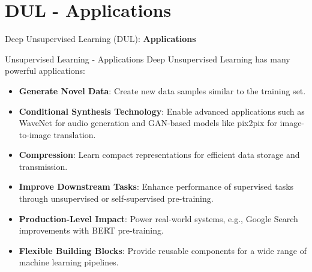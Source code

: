 \section{DUL - Applications}
\begin{frame}{}
    \LARGE Deep Unsupervised Learning (DUL): \textbf{Applications}
\end{frame}

\begin{frame}[allowframebreaks]{Unsupervised Learning - Applications}
    Deep Unsupervised Learning has many powerful applications:
    \begin{itemize}
        \item \textbf{Generate Novel Data}: Create new data samples similar to the training set.
        \item \textbf{Conditional Synthesis Technology}: Enable advanced applications such as WaveNet for audio generation and GAN-based models like pix2pix for image-to-image translation.
        \item \textbf{Compression}: Learn compact representations for efficient data storage and transmission.
        \item \textbf{Improve Downstream Tasks}: Enhance performance of supervised tasks through unsupervised or self-supervised pre-training.
        \item \textbf{Production-Level Impact}: Power real-world systems, e.g., Google Search improvements with BERT pre-training.
        \item \textbf{Flexible Building Blocks}: Provide reusable components for a wide range of machine learning pipelines.
    \end{itemize}
\end{frame}

